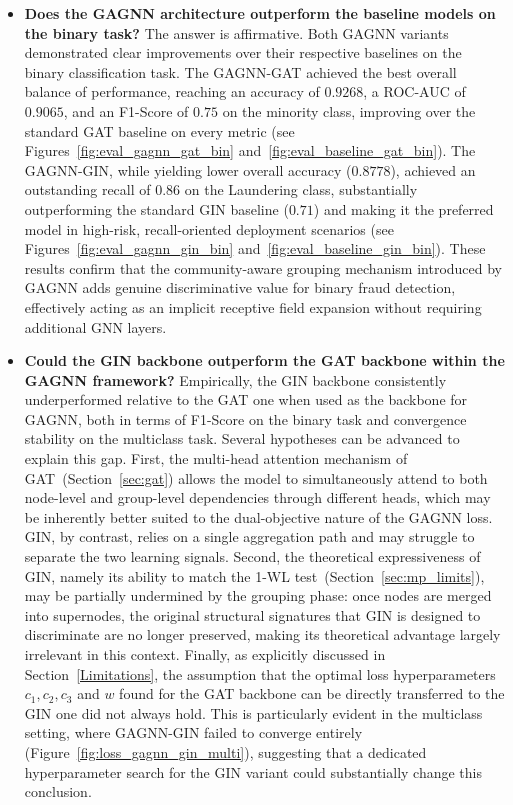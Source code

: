 \begin{itemize}

    \item \textbf{Does the GAGNN architecture outperform the baseline models on the binary task?}
    The answer is affirmative. Both GAGNN variants demonstrated clear improvements over their respective baselines on the binary classification task. The GAGNN-GAT achieved the best overall balance of performance, reaching an accuracy of \(0.9268\), a ROC-AUC of \(0.9065\), and an F1-Score of \(0.75\) on the minority class, improving over the standard GAT baseline on every metric (see Figures~\ref{fig:eval_gagnn_gat_bin} and~\ref{fig:eval_baseline_gat_bin}). The GAGNN-GIN, while yielding lower overall accuracy (\(0.8778\)), achieved an outstanding recall of \(0.86\) on the Laundering class, substantially outperforming the standard GIN baseline (\(0.71\)) and making it the preferred model in high-risk, recall-oriented deployment scenarios (see Figures~\ref{fig:eval_gagnn_gin_bin} and~\ref{fig:eval_baseline_gin_bin}). These results confirm that the community-aware grouping mechanism introduced by GAGNN adds genuine discriminative value for binary fraud detection, effectively acting as an implicit receptive field expansion without requiring additional GNN layers.

    \item \textbf{Could the GIN backbone outperform the GAT backbone within the GAGNN framework?}
    Empirically, the GIN backbone consistently underperformed relative to the GAT one when used as the backbone for GAGNN, both in terms of F1-Score on the binary task and convergence stability on the multiclass task. Several hypotheses can be advanced to explain this gap. First, the multi-head attention mechanism of GAT~(Section~\ref{sec:gat}) allows the model to simultaneously attend to both node-level and group-level dependencies through different heads, which may be inherently better suited to the dual-objective nature of the GAGNN loss. GIN, by contrast, relies on a single aggregation path and may struggle to separate the two learning signals. Second, the theoretical expressiveness of GIN, namely its ability to match the 1-WL test~(Section~\ref{sec:mp_limits}), may be partially undermined by the grouping phase: once nodes are merged into supernodes, the original structural signatures that GIN is designed to discriminate are no longer preserved, making its theoretical advantage largely irrelevant in this context. Finally, as explicitly discussed in Section~\ref{Limitations}, the assumption that the optimal loss hyperparameters \(c_1, c_2, c_3\) and \(w\) found for the GAT backbone can be directly transferred to the GIN one did not always hold. This is particularly evident in the multiclass setting, where GAGNN-GIN failed to converge entirely (Figure~\ref{fig:loss_gagnn_gin_multi}), suggesting that a dedicated hyperparameter search for the GIN variant could substantially change this conclusion.


\end{itemize}
